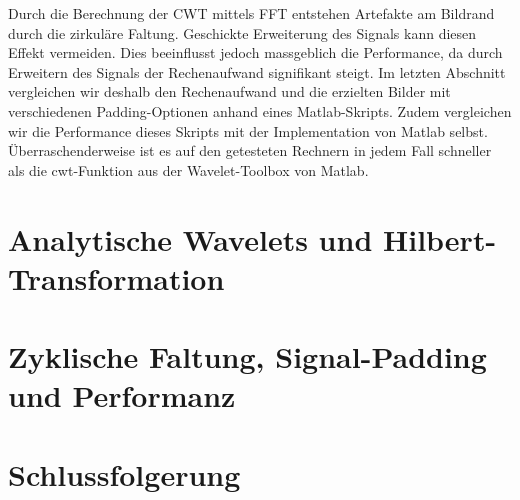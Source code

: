 \begin{refsection}
Durch die Berechnung der CWT mittels FFT entstehen Artefakte am Bildrand durch die zirkuläre Faltung.
Geschickte Erweiterung des Signals kann diesen Effekt vermeiden.
Dies beeinflusst jedoch massgeblich die Performance, da durch Erweitern des Signals der Rechenaufwand signifikant steigt.
Im letzten Abschnitt vergleichen wir deshalb den Rechenaufwand und die erzielten Bilder mit verschiedenen Padding-Optionen anhand eines Matlab-Skripts.
Zudem vergleichen wir die Performance dieses Skripts mit der Implementation von Matlab selbst.
Überraschenderweise ist es auf den getesteten Rechnern in jedem Fall schneller als die cwt-Funktion aus der Wavelet-Toolbox von Matlab.





\section{Analytische Wavelets und Hilbert-Transformation}




\section{Zyklische Faltung, Signal-Padding und Performanz}
\label{complex:circ-conv-padding}

\section{Schlussfolgerung}

\printbibliography[heading=subbibliography]
\end{refsection}
